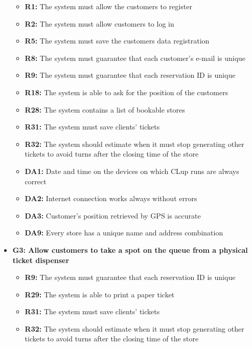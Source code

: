 \documentclass{article}
\begin{document}
\begin{itemize}
			\begin{itemize}
				\item {\bfseries R1:} The system must allow the customers to register
				\item {\bfseries R2:} The system must allow customers to log in
				\item {\bfseries R5:} The system must save the customers data registration
				\item {\bfseries R8:} The system must guarantee that each customer's e-mail is unique
				\item {\bfseries R9:} The system must guarantee that each reservation ID is unique
				\item {\bfseries R18:} The system is able to ask for the position of the customers
				\item {\bfseries R28:} The system contains a list of bookable stores
				\item {\bfseries R31:} The system must save clients’ tickets
				\item {\bfseries R32:} The system should estimate when it must stop generating other tickets to
avoid turns after the closing time of the store

				\item {\bfseries DA1:} Date and time on the devices on which CLup runs are always correct
				\item {\bfseries DA2:} Internet connection works always without errors
				\item {\bfseries DA3:} Customer’s position retrieved by GPS is accurate
				\item {\bfseries DA9:} Every store has a unique name and address combination
				
				\end{itemize}

\item {\bfseries G3: Allow customers to take a spot on the queue from a physical ticket dispenser}	

			\begin{itemize}
				\item {\bfseries R9:} The system must guarantee that each reservation ID is unique
				\item {\bfseries R29:} The system is able to print a paper ticket
				\item {\bfseries R31:} The system must save clients’ tickets
				\item {\bfseries R32:} The system should estimate when it must stop generating other tickets to
avoid turns after the closing time of the store


\end{itemize}
\end{itemize}
\end{document}
